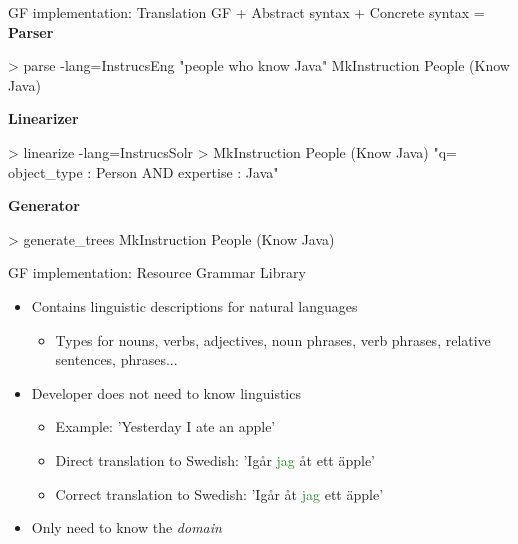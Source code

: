 \begin{frame}[fragile]{GF implementation: Translation}
GF + Abstract syntax + Concrete syntax = \pause
\newline
\newline
\textbf{Parser}
\begin{semiverbatim}
> parse -lang=InstrucsEng \textcolor{String}{"people who know Java"}
MkInstruction People (Know Java)
\end{semiverbatim} \pause
\textbf{Linearizer}
\begin{semiverbatim}
> linearize -lang=InstrucsSolr 
>                  MkInstruction People (Know Java)
\textcolor{String}{"q= object_type : Person AND expertise : Java"}
\end{semiverbatim} \pause
\textbf{Generator}
\begin{semiverbatim}
> generate_trees
MkInstruction People (Know Java)
\end{semiverbatim}
\end{frame}
\begin{frame}[fragile]{GF implementation: Resource Grammar Library}\pause
\begin{itemize}
\item Contains linguistic descriptions for natural languages\pause
  \begin{itemize}
    \item Types for nouns, verbs, adjectives, noun phrases, verb phrases, relative sentences, phrases...\pause
  \end{itemize}
  \item Developer does not need to know linguistics\pause
  \begin{itemize}
      \item Example: 'Yesterday I ate an apple' \pause
      \item Direct translation to Swedish: 'Ig{\aa}r \textcolor{ForestGreen}{jag} \textcolor{String}{{\aa}t} ett {\"a}pple' \pause
      \item Correct translation to Swedish: 'Ig{\aa}r \textcolor{String}{{\aa}t} \textcolor{ForestGreen}{jag} ett {\"a}pple' \pause
      \end{itemize}
  \item Only need to know the \emph{domain}
\end{itemize}
\end{frame}
